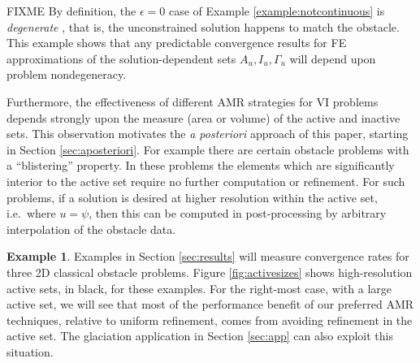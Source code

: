 \documentclass[]{interact}
\theoremstyle{plain}%
\theoremstyle{definition}
\newtheorem{example}[theorem]{Example}
\theoremstyle{remark}
\newcommand{\eps}{\epsilon}
\begin{document}
FIXME By definition, the $\eps=0$ case of Example \ref{example:notcontinuous} is \emph{degenerate} \cite{KinderlehrerStampacchia1980}, that is, the unconstrained solution happens to match the obstacle.  This example shows that any predictable convergence results for FE approximations of the solution-dependent sets $A_u,I_u,\Gamma_u$ will depend upon problem nondegeneracy.

Furthermore, the effectiveness of different AMR strategies for VI problems depends strongly upon the measure (area or volume) of the active and inactive sets.  This observation motivates the \emph{a posteriori} approach of this paper, starting in Section \ref{sec:aposteriori}.  For example there are certain obstacle problems with a ``blistering'' property.  In these problems the elements which are significantly interior to the active set require no further computation or refinement.  For such problems, if a solution is desired at higher resolution within the active set, i.e.~where $u=\psi$, then this can be computed in post-processing by arbitrary interpolation of the obstacle data.

\begin{example} \label{example:activesets} Examples in Section \ref{sec:results} will measure convergence rates for three 2D classical obstacle problems.  Figure \ref{fig:activesizes} shows high-resolution active sets, in black, for these examples.  For the right-most case, with a large active set, we will see that most of the performance benefit of our preferred AMR techniques, relative to uniform refinement, comes from avoiding refinement in the active set.  The glaciation application in Section \ref{sec:app} can also exploit this situation. \end{example}
\end{document}

